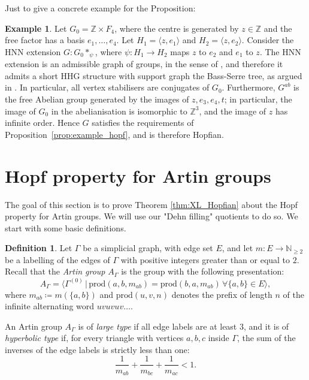 \documentclass[svgnames]{amsart}
\theoremstyle{plain}
\theoremstyle{definition}
\newtheorem{defn}[thm]{Definition}
\newtheorem{ex}[thm]{Example}
\newcommand{\Z}{\mathbb{Z}}
\begin{document}
Just to give a concrete example for the Proposition:

\begin{ex}\label{example:zxF}
    Let $G_0=\Z\times F_4$, where the centre is generated by $z\in \Z$ and the free factor has a basis $e_1,\ldots, e_4$. Let $H_1=\langle z, e_1\rangle$ and $H_2=\langle z, e_2\rangle$. Consider the HNN extension $G\colon G_0 *_\psi$, where $\psi\colon H_1\to H_2$ maps $z$ to $e_2$ and $e_1$ to $z$. The HNN extension is an admissible graph of groups, in the sense of \cite[Definition 3.1]{croke-Kleiner}, and therefore it admits a short HHG structure with support graph the Bass-Serre tree, as argued in \cite[Subsection 2.3.3]{Short_HHG:I}. In particular, all vertex stabilisers are conjugates of $G_0$. Furthermore, $G^{ab}$ is the free Abelian group generated by the images of $z, e_3, e_4,t$; in particular, the image of $G_0$ in the abelianisation is isomorphic to $\Z^3$, and the image of $z$ has infinite order. Hence $G$ satisfies the requirements of Proposition~\ref{prop:example_hopf}, and is therefore Hopfian.
\end{ex}


\section{Hopf property for Artin groups}\label{subsec:example_artin}

The goal of this section is to prove Theorem \ref{thm:XL_Hopfian} about the Hopf property for Artin groups. We will use our "Dehn filling" quotients to do so. We start with some basic definitions.

\begin{defn}
Let $\Gamma$ be a simplicial graph, with edge set $E$, and let $m\colon E\to \mathbb{N}_{\ge 2}$ be a labelling of the edges of $\Gamma$ with positive integers greater than or equal to $2$. Recall that the \emph{Artin group} $A_\Gamma$ is the group with the following presentation:
$$A_{\Gamma}=\langle \Gamma^{(0)}\,|\, \mathrm{prod}(a,b,m_{ab})=\mathrm{prod}(b,a,m_{ab}) \, \forall \{a,b\}\in E\rangle,$$
where $m_{ab}\coloneq m(\{a,b\})$ and $\mathrm{prod}(u,v,n)$ denotes the prefix  of length $n$ of the infinite alternating word $uvuvuv\dots$. 

An Artin group $A_\Gamma$ is of \emph{large type} if all edge labels are at least $3$, and it is of \emph{hyperbolic type} if, for every triangle with vertices $a,b,c$ inside $\Gamma$, the sum of the inverses of the edge labels is strictly less than one:
$$\frac{1}{m_{ab}}+\frac{1}{m_{bc}}+\frac{1}{m_{ac}}<1.$$
\end{defn}
\end{document}
